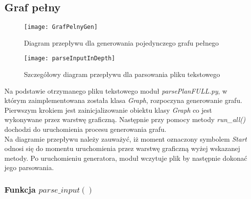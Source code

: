     \subsection{Graf pełny}

    \begin{figure}
        \texttt{[image: GrafPelnyGen]}
        \centering
        \caption{Diagram przepływu dla generowania pojedynczego grafu pełnego}
    \end{figure}

    \begin{figure}
        \texttt{[image: parseInputInDepth]}
        \centering
        \caption{Szczegółowy diagram przepływu dla parsowania pliku tekstowego}
    \end{figure}

    Na podstawie otrzymanego pliku tekstowego moduł \textit{parsePlanFULL.py}, w którym zaimplementowana została klasa \textit{Graph},
    rozpoczyna generowanie grafu. Pierwszym krokiem jest zainicjalizowanie obiektu klasy \textit{Graph} co jest wykonywane przez warstwę graficzną.
    Następnie przy pomocy metody \textit{run\_all()} dochodzi do uruchomienia procesu generowania grafu. \\
    Na diagramie przepływu należy 
    zauważyć, iż moment oznaczony symbolem \textit{Start} odnosi się do momentu uruchomienia przez warstwę graficzną wyżej wskazanej metody.
    Po uruchomieniu generatora, moduł wczytuje plik by następnie dokonać jego parsowania.

    \subsubsection{Funkcja $parse\_input()$}

